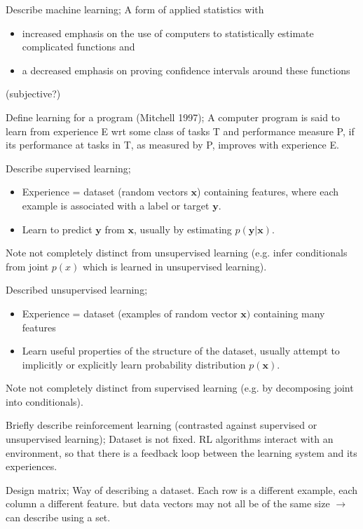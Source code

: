 \documentclass{article}
\begin{document}

Describe machine learning; A form of applied statistics with \begin{itemize} \item increased emphasis on the use of computers to statistically estimate complicated functions and \item a decreased emphasis on proving confidence intervals around these functions \end{itemize} (subjective?)

Define learning for a program (Mitchell 1997); A computer program is said to learn from experience E wrt some class of tasks T and performance measure P, if its performance at tasks in T, as measured by P, improves with experience E.

Describe supervised learning; \begin{itemize} \item Experience =  dataset (random vectors $\mathbf{x}$) containing features, where each example is associated with a label or target $\mathbf{y}$.  \item Learn to predict $\mathbf{y}$ from $\mathbf{x}$, usually by estimating $p(\mathbf{y}|\mathbf{x})$.  \end{itemize} Note not completely distinct from unsupervised learning (e.g. infer conditionals from joint $p(x)$ which is learned in unsupervised learning).

Described unsupervised learning; \begin{itemize} \item Experience =  dataset (examples of random vector $\mathbf{x})$ containing many features \item Learn useful properties of the structure of the dataset, usually attempt to implicitly or explicitly learn probability distribution $p(\mathbf{x})$.  \end{itemize} Note not completely distinct from supervised learning (e.g. by decomposing joint into conditionals).

Briefly describe reinforcement learning (contrasted against supervised or unsupervised learning); Dataset is not fixed. RL algorithms interact with an environment, so that there is a feedback loop between the learning system and its experiences.

Design matrix; Way of describing a dataset. Each row is a different example, each column a different feature. \newline but data vectors may not all be of the same size $\to$ can describe using a set.
\end{document}
